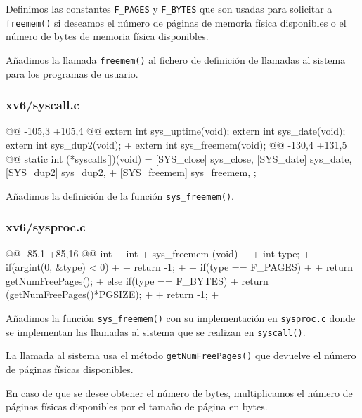 \par Definimos las constantes \texttt{F\_PAGES} y \texttt{F\_BYTES} que
son usadas para solicitar a \texttt{freemem()} si deseamos el número de páginas de memoria física
disponibles o el número de bytes de memoria física disponibles.

\par Añadimos la llamada \texttt{freemem()} al fichero de definición de llamadas 
al sistema para los programas de usuario.


\subsubsection{xv6/syscall.c}
\begin{listing}
@@ -105,3 +105,4 @@
    extern int sys_uptime(void);
    extern int sys_date(void);
    extern int sys_dup2(void);
+   extern int sys_freemem(void);
@@ -130,4 +131,5 @@ static int (*syscalls[])(void) = {
    [SYS_close]   sys_close,
    [SYS_date]    sys_date,
    [SYS_dup2]    sys_dup2,
+   [SYS_freemem] sys_freemem,
    };
\end{listing}
\par Añadimos la definición de la función \texttt{sys\_freemem()}.

\subsubsection{xv6/sysproc.c}
\begin{listing}
@@ -85,1 +85,16 @@ int
+   int 
+   sys_freemem (void)
+   {
+       int type;
+       if(argint(0, &type) < 0)
+       {
+           return -1;
+       }
+       if(type == F_PAGES)
+       {
+           return getNumFreePages();
+       }else if(type == F_BYTES){
+           return (getNumFreePages()*PGSIZE);
+       }
+       return -1;
+   }
\end{listing}
\par Añadimos la función \texttt{sys\_freemem()} con su implementación en \texttt{sysproc.c}
donde se implementan las llamadas al sistema que se realizan en \texttt{syscall()}.

\par La llamada al sistema usa el método \texttt{getNumFreePages()} que
devuelve el número de páginas físicas disponibles.

\par En caso de que se desee obtener el número de bytes, multiplicamos el número de páginas físicas disponibles
por el tamaño de página en bytes.

